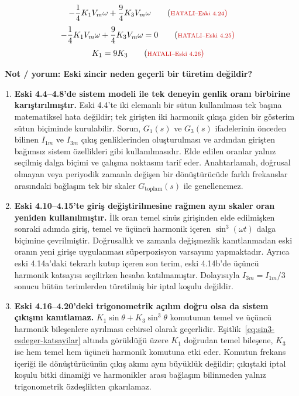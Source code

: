 \begin{equation*}
  -\frac{1}{4}K_1V_m\omega+\frac{9}{4}K_3V_m\omega
  \hatalieskitag{4.24}
\end{equation*}
\begin{equation*}
  -\frac{1}{4}K_1V_m\omega+\frac{9}{4}K_3V_m\omega=0
  \hatalieskitag{4.25}
\end{equation*}
\begin{equation*}
  K_1=9K_3
  \hatalieskitag{4.26}
\end{equation*}

\clearpage
\hatalidenklemetiketi\ \textbf{Not / yorum: Eski zincir neden geçerli bir türetim değildir?}

\begin{enumerate}[leftmargin=*,label=\textbf{Yorum \arabic*:}]
  \item \textbf{Eski 4.4--4.8'de sistem modeli ile tek deneyin genlik oranı birbirine karıştırılmıştır.} Eski 4.4'te iki elemanlı bir sütun kullanılması tek başına matematiksel hata değildir; tek girişten iki harmonik çıkışa giden bir gösterim sütun biçiminde kurulabilir. Sorun, $G_1(s)$ ve $G_3(s)$ ifadelerinin önceden bilinen $I_{1m}$ ve $I_{3m}$ çıkış genliklerinden oluşturulması ve ardından girişten bağımsız sistem özellikleri gibi kullanılmasıdır. Elde edilen oranlar yalnız seçilmiş dalga biçimi ve çalışma noktasını tarif eder. Anahtarlamalı, doğrusal olmayan veya periyodik zamanla değişen bir dönüştürücüde farklı frekanslar arasındaki bağlaşım tek bir skaler $G_{\mathrm{toplam}}(s)$ ile genellenemez.

  \item \textbf{Eski 4.10--4.15'te giriş değiştirilmesine rağmen aynı skaler oran yeniden kullanılmıştır.} İlk oran temel sinüs girişinden elde edilmişken sonraki adımda giriş, temel ve üçüncü harmonik içeren $\sin^3(\omega t)$ dalga biçimine çevrilmiştir. Doğrusallık ve zamanla değişmezlik kanıtlanmadan eski oranın yeni girişe uygulanması süperpozisyon varsayımı yapmaktadır. Ayrıca eski 4.14a'daki tekrarlı kutup içeren son terim, eski 4.14b'de üçüncü harmonik katsayısı seçilirken hesaba katılmamıştır. Dolayısıyla $I_{3m}=I_{1m}/3$ sonucu bütün terimlerden türetilmiş bir iptal koşulu değildir.

  \item \textbf{Eski 4.16--4.20'deki trigonometrik açılım doğru olsa da sistem çıkışını kanıtlamaz.} $K_1\sin\theta+K_3\sin^3\theta$ komutunun temel ve üçüncü harmonik bileşenlere ayrılması cebirsel olarak geçerlidir. Eşitlik~\eqref{eq:sin3-esdeger-katsayilar} altında görüldüğü üzere $K_1$ doğrudan temel bileşene, $K_3$ ise hem temel hem üçüncü harmonik komutuna etki eder. Komutun frekans içeriği ile dönüştürücünün çıkış akımı aynı büyüklük değildir; çıkıştaki iptal koşulu bitki dinamiği ve harmonikler arası bağlaşım bilinmeden yalnız trigonometrik özdeşlikten çıkarılamaz.


\end{enumerate}
